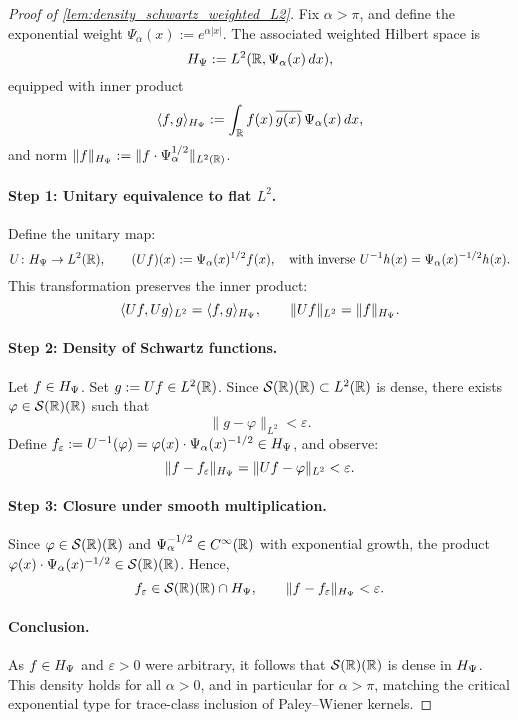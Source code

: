 \begin{proof}[Proof of \cref{lem:density_schwartz_weighted_L2}]
Fix \( \alpha > \pi \), and define the exponential weight \( \Psi_\alpha(x) := e^{\alpha |x|} \). The associated weighted Hilbert space is
\[
H_{\Psi} := L^2(\mathbb{R}, \Psi_\alpha(x)\,dx),
\]
equipped with inner product
\[
\langle f, g \rangle_{H_{\Psi}} := \int_{\mathbb{R}} f(x)\, \overline{g(x)}\, \Psi_\alpha(x)\, dx,
\]
and norm \( \|f\|_{H_{\Psi}} := \|f \cdot \Psi_\alpha^{1/2} \|_{L^2(\mathbb{R})} \).

\paragraph{Step 1: Unitary equivalence to flat \( L^2 \).}
Define the unitary map:
\[
U \colon H_{\Psi} \to L^2(\mathbb{R}), \qquad (Uf)(x) := \Psi_\alpha(x)^{1/2} f(x), \quad \text{with inverse } U^{-1} h(x) = \Psi_\alpha(x)^{-1/2} h(x).
\]
This transformation preserves the inner product:
\[
\langle Uf, Ug \rangle_{L^2} = \langle f, g \rangle_{H_{\Psi}}, \qquad \|Uf\|_{L^2} = \|f\|_{H_{\Psi}}.
\]

\paragraph{Step 2: Density of Schwartz functions.}
Let \( f \in H_{\Psi} \). Set \( g := Uf \in L^2(\mathbb{R}) \). Since \( \mathcal{S}(\mathbb{R})(\mathbb{R}) \subset L^2(\mathbb{R}) \) is dense, there exists \( \varphi \in \mathcal{S}(\mathbb{R})(\mathbb{R}) \) such that
\[
\|g - \varphi\|_{L^2} < \varepsilon.
\]
Define \( f_\varepsilon := U^{-1}(\varphi) = \varphi(x) \cdot \Psi_\alpha(x)^{-1/2} \in H_{\Psi} \), and observe:
\[
\|f - f_\varepsilon\|_{H_{\Psi}} = \|Uf - \varphi\|_{L^2} < \varepsilon.
\]

\paragraph{Step 3: Closure under smooth multiplication.}
Since \( \varphi \in \mathcal{S}(\mathbb{R})(\mathbb{R}) \) and \( \Psi_\alpha^{-1/2} \in C^\infty(\mathbb{R}) \) with exponential growth, the product \( \varphi(x) \cdot \Psi_\alpha(x)^{-1/2} \in \mathcal{S}(\mathbb{R})(\mathbb{R}) \). Hence,
\[
f_\varepsilon \in \mathcal{S}(\mathbb{R})(\mathbb{R}) \cap H_{\Psi}, \qquad \|f - f_\varepsilon\|_{H_{\Psi}} < \varepsilon.
\]

\paragraph{Conclusion.}
As \( f \in H_{\Psi} \) and \( \varepsilon > 0 \) were arbitrary, it follows that \( \mathcal{S}(\mathbb{R})(\mathbb{R}) \) is dense in \( H_{\Psi} \). This density holds for all \( \alpha > 0 \), and in particular for \( \alpha > \pi \), matching the critical exponential type for trace-class inclusion of Paley--Wiener kernels.


\end{proof}
